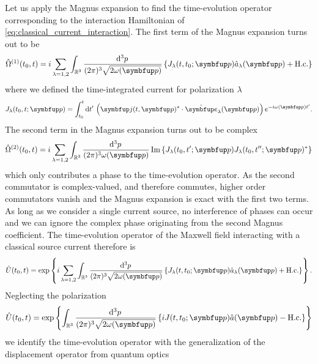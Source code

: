 Let us apply the Magnus expansion to find the time-evolution operator corresponding to the interaction Hamiltonian of \cref{eq:classical_current_interaction}.
The first term of the Magnus expansion turns out to be
\begin{equation}
	\hat{\Omega}^{(1)}(t_0,t)
	=
	i
	\sum_{\lambda=1,2}
	\int_{\mathbb{R}^3}\frac{\dd[3]{p}}{(2\pi)^3\sqrt{2\omega(\vb{p})}}
	\left\{
		J_\lambda(t,t_0;\vb{p})
		\hat{a}_\lambda(\vb{p})
		+
		\text{H.c.}
	\right\}
\end{equation}
where we defined the time-integrated current for polarization $\lambda$
\begin{equation}
	J_\lambda(t_0,t;\vb{p})
	=
	\int_{t_0}^t\dd{t^\prime}
	\left(
		\vb{j}(t,\vb{p})^*
		\vdot
		\vu{e}_\lambda(\vb{p})
	\right)
	e^{-i\omega(\vb{p})t^\prime}
	.
\end{equation}
The second term in the Magnus expansion turns out to be complex
\begin{equation}
	\hat{\Omega}^{(2)}(t_0,t)
	=
	i\sum_{\lambda=1,2}
	\int_{\mathbb{R}^3}\frac{\dd[3]{p}}{(2\pi)^3\omega(\vb{p})}
	\Im\left\{
		J_\lambda(t_0,t^\prime;\vb{p})
		J_\lambda(t_0,t^{\prime\prime};\vb{p})^*
	\right\}
\end{equation}
which only contributes a phase to the time-evolution operator.
As the second commutator is complex-valued, and therefore commutes, higher order commutators vanish and the Magnus expansion is exact with the first two terms.
As long as we consider a single current source, no interference of phases can occur and we can ignore the complex phase originating from the second Magnus coefficient.
The time-evolution operator of the Maxwell field interacting with a classical source current therefore is~\cite[p.~168]{Itzykson2012}
\begin{equation}
	\hat{U}(t_0,t)
	=
	\exp\left\{
		i\sum_{\lambda=1,2}
		\int_{\mathbb{R}^3}\frac{\dd[3]{p}}{(2\pi) ^3\sqrt{2\omega(\vb{p})}}
		\left\{
			J_\lambda(t,t_0;\vb{p})
			\hat{a}_\lambda(\vb{p})
			+
			\text{H.c.}
		\right\}
	\right\}
	.
\end{equation}
Neglecting the polarization 
\begin{equation}
	\hat{U}(t_0,t)
	=
	\exp\left\{
		\int_{\mathbb{R}^3}\frac{\dd[3]{p}}{(2\pi) ^3\sqrt{2\omega(\vb{p})}}
		\left\{
			i
			J(t,t_0;\vb{p})
			\hat{a}(\vb{p})
			-
			\text{H.c.}
		\right\}
	\right\}
\end{equation}
we identify the time-evolution operator with the generalization of the displacement operator from quantum optics~\cite[p.~47]{Barnett2002}

